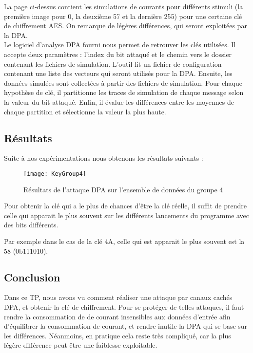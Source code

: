 \begin{figure}[h!]
    \centering
    
\end{figure}

La page ci-dessus contient les simulations de courants pour différents stimuli
(la première image pour 0, la deuxième 57 et la dernière 255) pour une certaine
clé de chiffrement AES. On remarque de légères différences, qui seront
exploitées par la DPA.\\

Le logiciel d'analyse DPA fourni nous permet de retrouver les clés utilisées.
Il accepte deux paramètres : l'index du bit attaqué et le chemin vers le
dossier contenant les fichiers de simulation.
L'outil lit un fichier de configuration contenant une liste des vecteurs qui
seront utilisés pour la DPA. Ensuite, les données simulées sont collectées à 
partir des fichiers de simulation. Pour chaque hypothèse de clé, il partitionne
les traces de simulation de chaque message selon la valeur du bit attaqué.
Enfin, il évalue les différences entre les moyennes de chaque partition et 
sélectionne la valeur la plus haute.


\subsection{Résultats}

Suite à nos expérimentations nous obtenons les résultats suivants :

\begin{figure}[h!]
\texttt{[image: KeyGroup4]}
\caption{Résultats de l'attaque DPA sur l'ensemble de données du groupe 4}
\end{figure}

Pour obtenir la clé qui a le plus de chances d'être la clé réelle, il suffit 
de prendre celle qui apparait le plus souvent sur les différents lancements
du programme avec des bits différents.

Par exemple dans le cas de la clé 4A, celle qui est apparait le plus souvent est
la 58 (0b111010).

\subsection{Conclusion}

Dans ce TP, nous avons vu comment réaliser une attaque par canaux cachés DPA, et
obtenir la clé de chiffrement. Pour se protéger de telles attaques, il faut 
rendre la consommation de de courant insensibles aux données d'entrée afin
d'équilibrer la consommation de courant, et rendre inutile la DPA qui se base
sur les différences. Néanmoins, en pratique cela reste très compliqué, car la
plus légère différence peut être une faiblesse exploitable.
